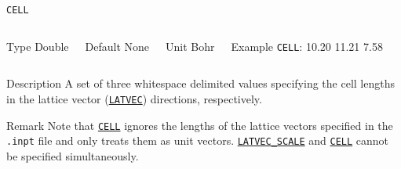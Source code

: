 \documentclass[xcolor=dvipsnames,t]{beamer}
\begin{document}
\begin{frame}[allowframebreaks]{\texttt{CELL}} \label{CELL}
\vspace*{-12pt}
\begin{columns}
\begin{block}{Type}
Double
\end{block}

\begin{block}{Default}
None
\end{block}

\begin{block}{Unit}
Bohr
\end{block}
    
\begin{block}{Example}
\texttt{CELL}: 10.20 11.21 7.58
\end{block}
\end{columns}
\begin{block}{Description}
A set of three whitespace delimited values specifying the cell lengths in the lattice vector (\hyperlink{LATVEC}{\texttt{LATVEC}}) directions, respectively.
\end{block}
\begin{block}{Remark}
    Note that \hyperlink{CELL}{\texttt{CELL}} ignores the lengths of the lattice vectors specified in the \texttt{.inpt} file and only treats them as unit vectors. \hyperlink{LATVEC_SCALE}{\texttt{LATVEC\_SCALE}} and \hyperlink{CELL}{\texttt{CELL}} cannot be specified simultaneously.
\end{block}

\end{frame}
\end{document}
